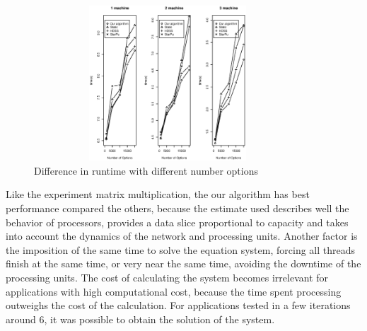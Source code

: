 \documentclass[journal]{IEEEtran}
\begin{document}
\begin{figure}[htb]
	\begin{center}
	\centering
			\includegraphics[width=10cm,height=5.8cm]{MaquinaBlack.eps}
	\caption{Difference in runtime with different number options}
	\label{fig:black}
	\end{center}
\end{figure}

Like the experiment matrix multiplication, the our algorithm has best performance compared the others, because the estimate used describes well the behavior of processors, provides a data slice proportional to capacity and takes into account the dynamics of the network and processing units. Another factor is the imposition of the same time to solve the equation system, forcing all threads finish at the same time, or very near the same time, avoiding the downtime of the processing units. The cost of calculating the system becomes irrelevant for applications with high computational cost, because the time spent processing outweighs the cost of the calculation. For applications tested in a few iterations around 6, it was possible to obtain the solution of the system.
\end{document}
